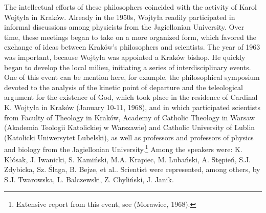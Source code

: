 \documentclass[a4paper]{article}
\begin{document}
The intellectual efforts of these philosophers coincided with the activity of Karol Wojtyła in Kraków. Already in the
1950s, Wojtyła readily participated in informal discussions among physicists from the Jagiellonian University. Over
time, these meetings began to take on a more organized form, which favored the exchange of ideas between Kraków's
philosophers and scientists. The year of 1963 was important, because Wojtyła was appointed a Kraków bishop. He quickly
began to develop the local milieu, initiating a series of interdisciplinary events. One of this event can be mention
here, for example, the philosophical symposium devoted to the analysis of the kinetic point of departure and the
teleological argument for the existence of God, which took place in the residence of Cardinal K. Wojtyła in Kraków
(January 10-11, 1968), and in which participated scientists from Faculty of Theology in Kraków, Academy of Catholic
Theology in Warsaw (Akademia Teologii Katolickiej w Warszawie) and Catholic University of Lublin (Katolicki Uniwersytet
Lubelski), as well as professors and professors of physics and biology from the Jagiellonian University.\footnote{
Extensive report from this event, see \label{ref:RNDOKp52VRWKL}(Morawiec, 1968).} Among the speakers were: K. Kłósak,
J. Iwanicki, S. Kamiński, M.A. Krapiec, M. Lubański, A. Stępień, S.J. Zdybicka, Sz. Ślaga, B. Bejze, et al.. Scientist
were represented, among others, by S.J. Twarowska, L. Balczewski, Z. Chyliński, J. Janik.
\end{document}
